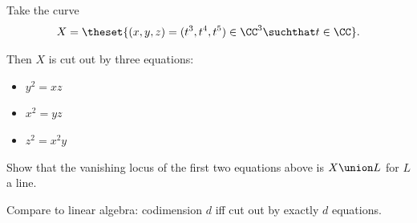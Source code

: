 \begin{example}

Take the curve
\begin{align*}  
X = \theset{(x, y, z) = (t^3, t^4, t^5) \in \CC^3 \suchthat t\in \CC}
.\end{align*}

Then \(X\) is cut out by three equations:

\begin{itemize}
\tightlist
\item
  \(y^2 = xz\)
\item
  \(x^2 = yz\)
\item
  \(z^2 = x^2 y\)
\end{itemize}

\end{example}

\begin{exercise}

Show that the vanishing locus of the first two equations above is
\(X\union L\) for \(L\) a line.

\end{exercise}

Compare to linear algebra: codimension \(d\) iff cut out by exactly
\(d\) equations.

